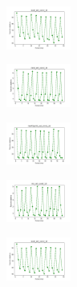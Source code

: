 \begin{figure}[H]
    \begin{subfigure}
        \centering
        \includegraphics[width=0.234\textwidth]{img/ils-es/ecoli_set_const_10_589741062_cost.png}
    \end{subfigure}
    \hfill
    \begin{subfigure}
        \centering
        \includegraphics[width=0.234\textwidth]{img/ils-es/rand_set_const_10_589741062_cost.png}
    \end{subfigure}
    \hfill
    \begin{subfigure}
        \centering
        \includegraphics[width=0.234\textwidth]{img/ils-es/newthyroid_set_const_10_589741062_cost.png}
    \end{subfigure}
    \hfill
    \begin{subfigure}
        \centering
        \includegraphics[width=0.234\textwidth]{img/ils-es/iris_set_const_10_277451237_cost.png}
    \end{subfigure}
    \hfill
    \begin{subfigure}
        \centering
        \includegraphics[width=0.234\textwidth]{img/ils-es/ecoli_set_const_10_277451237_cost.png}
    \end{subfigure}
    \hfill
    \begin{subfigure}

\end{subfigure}
\end{figure}
